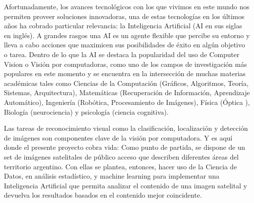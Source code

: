 \documentclass[11pt, oneside]{Thesis} %
\begin{document}
Afortunadamente, los avances tecnológicos con los que vivimos en este mundo nos permiten proveer soluciones innovadoras, una de estas tecnologías  en los últimos años ha cobrado particular relevancia: la Inteligencia Artificial (AI en sus siglas en inglés). A grandes rasgos una AI es un agente flexible que percibe su entorno y lleva a cabo acciones que maximicen sus posibilidades de éxito en algún objetivo o tarea. Dentro de lo que la AI se destaca la popularidad del uso de Computer Vision  o Visión por computadoras, como uno de los campos de investigación más populares en este momento y se encuentra en la intersección de muchas materias académicas tales como Ciencias de la Computación (Gráficos, Algoritmos, Teoría, Sistemas, Arquitectura), Matemáticas (Recuperación de Información, Aprendizaje Automático), Ingeniería (Robótica, Procesamiento de Imágenes), Física (Óptica ), Biología (neurociencia) y psicología (ciencia cognitiva). 

Las tareas de reconocimiento visual como la clasificación, localización y detección de imágenes son componentes clave de la visión por computadora. Y es aquí donde el presente proyecto cobra vida: Como punto de partida, se dispone de un set de imágenes satelitales de público acceso que describen diferentes áreas del territorio argentino. Con ellas se plantea, entonces, hacer uso de la Ciencia de Datos, en análisis estadístico, y machine learning para implementar una Inteligencia Artificial que permita analizar el contenido de una imagen satelital y devuelva los resultados basados ​​en el contenido mejor coincidente.
\vspace*{\fill}

\newpage




\end{document}
